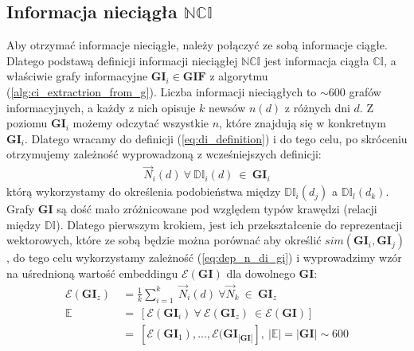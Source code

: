 \subsection{Informacja nieciągła $\mathbb{NCI}$}
Aby otrzymać informacje nieciągłe, należy połączyć ze sobą informacje ciągłe.
Dlatego podstawą definicji informacji nieciągłej $\mathbb{NCI}$ jest informacja 
ciągła $\mathbb{CI}$, a właściwie grafy informacyjne $\mathbf{GI}_i \in \mathbf{GIF}$
z algorytmu (\ref{alg:ci_extractrion_from_g}). 
Liczba informacji nieciągłych to $\sim 600$ grafów informacyjnych, a każdy z nich opisuje
$k$ newsów $n(d)$ z różnych dni $d$. Z poziomu $\mathbf{GI}_i$ możemy odczytać wszystkie $n$,
które znajdują się w konkretnym $\mathbf{GI}_i$. 
Dlatego wracamy do definicji (\ref{eq:di_definition}) i do tego celu, po skróceniu
otrzymujemy zależność wyprowadzoną z wcześniejszych definicji:
\begin{equation}
    \label{eq:dep_n_di_gi}
    \begin{aligned}
        \vec{N}_i(d) \: \forall \: \mathbb{DI}_i(d) \: \in \: \mathbf{GI}_i
    \end{aligned}
\end{equation}
którą wykorzystamy do określenia podobieństwa między 
$\mathbb{DI}_i(d_j)$ a $\mathbb{DI}_l(d_k)$. Grafy $\mathbf{GI}$ są dość mało 
zróżnicowane pod względem typów krawędzi (relacji między $\mathbb{DI}$). 
Dlatego pierwszym krokiem, jest ich przekształcenie do reprezentacji wektorowych,
które ze sobą będzie można porównać aby określić $sim(\mathbf{GI}_i, \mathbf{GI}_j)$,
do tego celu wykorzystamy zależność (\ref{eq:dep_n_di_gi}) i wyprowadzimy
wzór na uśrednioną wartość embeddingu $\mathcal{E}(\mathbf{GI})$
dla dowolnego $\mathbf{GI}$:
\begin{equation}
\label{eq:avg_emb_from_ci}
    \begin{aligned}
        \mathcal{E}(\mathbf{GI}_{z}) \: & =
            \frac{1}{k} 
            \sum_{i=1}^{k} \: \vec{N}_i(d) \: 
                \forall \vec{N}_k \: 
                \in \: \mathbf{GI}_{z}
        \\
        \mathbb{E} \: & =
            \: \left[
                \mathcal{E}(\mathbf{GI}_{i}) \: 
                \forall \: \mathcal{E}(\mathbf{GI}_{z}) \:
                \in \mathcal{E}(\mathbf{GI})
            \right]
            \\
            & = \: \left[
                \mathcal{E}(\mathbf{GI}_{1}), 
                ..., 
                \mathcal{E}(\mathbf{GI}_{|\mathbf{GI}|}
            \right], \: 
            |\mathbb{E}| = |\mathbf{GI}| \sim 600
    \end{aligned}
\end{equation}
